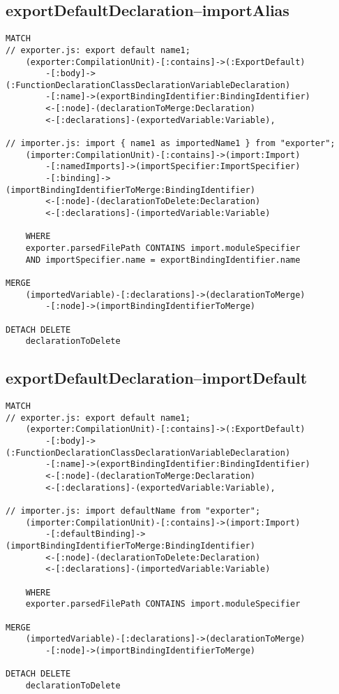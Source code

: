 \newpage
\subsection{exportDefaultDeclaration–importAlias}
\begin{lstlisting}[language=Cypher]
MATCH
// exporter.js: export default name1;
    (exporter:CompilationUnit)-[:contains]->(:ExportDefault)
        -[:body]->(:FunctionDeclarationClassDeclarationVariableDeclaration)
        -[:name]->(exportBindingIdentifier:BindingIdentifier)
        <-[:node]-(declarationToMerge:Declaration)
        <-[:declarations]-(exportedVariable:Variable),

// importer.js: import { name1 as importedName1 } from "exporter";
    (importer:CompilationUnit)-[:contains]->(import:Import)
        -[:namedImports]->(importSpecifier:ImportSpecifier)
        -[:binding]->(importBindingIdentifierToMerge:BindingIdentifier)
        <-[:node]-(declarationToDelete:Declaration)
        <-[:declarations]-(importedVariable:Variable)

    WHERE
    exporter.parsedFilePath CONTAINS import.moduleSpecifier
    AND importSpecifier.name = exportBindingIdentifier.name

MERGE
    (importedVariable)-[:declarations]->(declarationToMerge)
        -[:node]->(importBindingIdentifierToMerge)

DETACH DELETE
    declarationToDelete
\end{lstlisting}


\newpage
\subsection{exportDefaultDeclaration–importDefault}
\begin{lstlisting}[language=Cypher]
MATCH
// exporter.js: export default name1;
    (exporter:CompilationUnit)-[:contains]->(:ExportDefault)
        -[:body]->(:FunctionDeclarationClassDeclarationVariableDeclaration)
        -[:name]->(exportBindingIdentifier:BindingIdentifier)
        <-[:node]-(declarationToMerge:Declaration)
        <-[:declarations]-(exportedVariable:Variable),

// importer.js: import defaultName from "exporter";
    (importer:CompilationUnit)-[:contains]->(import:Import)
        -[:defaultBinding]->(importBindingIdentifierToMerge:BindingIdentifier)
        <-[:node]-(declarationToDelete:Declaration)
        <-[:declarations]-(importedVariable:Variable)

    WHERE
    exporter.parsedFilePath CONTAINS import.moduleSpecifier

MERGE
    (importedVariable)-[:declarations]->(declarationToMerge)
        -[:node]->(importBindingIdentifierToMerge)

DETACH DELETE
    declarationToDelete
\end{lstlisting}


